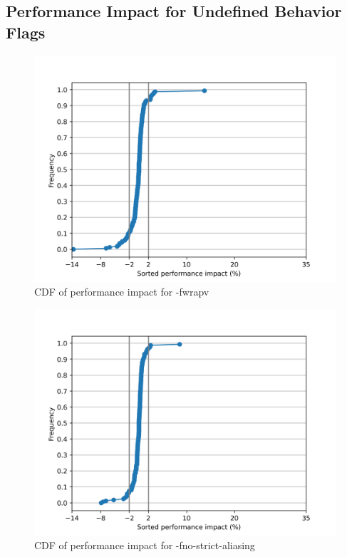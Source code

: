 \subsection{Performance Impact for Undefined Behavior Flags}
\label{sec:flags-results}

\begin{figure}
\centering
\includegraphics{fwrapv}
\caption{CDF of performance impact for -fwrapv}
\end{figure}

\begin{figure}
\centering
\includegraphics{fno-strict-aliasing}
\caption{CDF of performance impact for -fno-strict-aliasing}
\end{figure}

